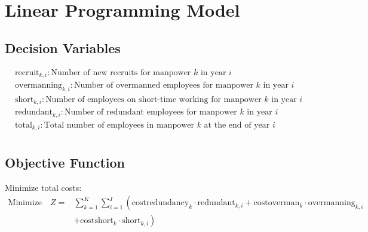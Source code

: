 \documentclass{article}
\begin{document}
\section*{Linear Programming Model}

\subsection*{Decision Variables}
\begin{align*}
& \text{recruit}_{k, i}: \text{Number of new recruits for manpower } k \text{ in year } i \\
& \text{overmanning}_{k, i}: \text{Number of overmanned employees for manpower } k \text{ in year } i \\
& \text{short}_{k, i}: \text{Number of employees on short-time working for manpower } k \text{ in year } i \\
& \text{redundant}_{k, i}: \text{Number of redundant employees for manpower } k \text{ in year } i \\
& \text{total}_{k, i}: \text{Total number of employees in manpower } k \text{ at the end of year } i \\
\end{align*}

\subsection*{Objective Function}
Minimize total costs:
\[
\begin{align*}
\text{Minimize} \quad Z = & \sum_{k=1}^{K} \sum_{i=1}^{I} \left( \text{costredundancy}_{k} \cdot \text{redundant}_{k, i} + \text{costoverman}_{k} \cdot \text{overmanning}_{k, i} \right.\\
& \left. + \text{costshort}_{k} \cdot \text{short}_{k, i} \right)
\end{align*}
\]
\end{document}
